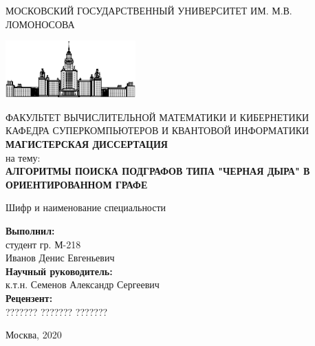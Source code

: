 \documentclass[12pt,a4paper,oneside]{article}
\theoremstyle{definition}
\theoremstyle{lemma}
\theoremstyle{remark}
\begin{document}
\begin{titlepage}
        \begin{center}

        \bigskip

        \MakeTextUppercase{Московский государственный университет им. М.В. Ломоносова} \\

        \bigskip

        \includegraphics[width=50mm]{msu.eps}

        \bigskip
        \MakeTextUppercase{Факультет вычислительной математики и кибернетики} \\
        \MakeTextUppercase{Кафедра суперкомпьютеров и квантовой информатики} \\
        \bigskip
        \bigskip
        \MakeTextUppercase{\textbf{\Huge Магистерская диссертация}} \\
        \bigskip
        {\large на тему:} \\
        \bigskip
        \MakeTextUppercase{\textbf{\large Алгоритмы поиска подграфов типа "черная дыра" в ориентированном графе}}

        \bigskip
        Шифр и наименование специальности

    \end{center}

    \bigskip
    \bigskip
    \bigskip
    \begin{flushright}
        \begin{minipage}{7cm}
            \textbf{Выполнил:} \\
            студент гр. М-218 \\
            Иванов Денис Евгеньевич \\

            \textbf{Научный руководитель:} \\
            к.т.н. Семенов Александр Сергеевич \\

            \textbf{Рецензент:} \\
            ??????? ??????? ???????
        \end{minipage}
    \end{flushright}

    \vfill

    \begin{center}
    {\large Москва, 2020}
    \end{center}

\end{titlepage}
\end{document}
